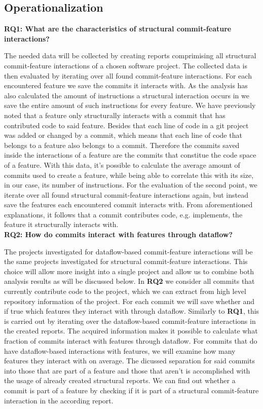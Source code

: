 \subsection*{Operationalization}\label{sec:operationalization}

\textbf{RQ1: What are the characteristics of structural commit-feature interactions?}

The needed data will be collected by creating reports comprimising all structural commit-feature interactions of a chosen software project.
The collected data is then evaluated by iterating over all found commit-feature interactions.
For each encountered feature we save the commits it interacts with.
As the analysis has also calculated the amount of instructions a structural interaction occurs in 
we save the entire amount of such instructions for every feature.
We have previously noted that a feature only structurally interacts with a commit that has contributed code to said feature.
Besides that each line of code in a git project was added or changed by a commit, 
which means that each line of code that belongs to a feature also belongs to a commit.
Therefore the commits saved inside the interactions of a feature are the commits that constitue the code space of a feature. 
With this data, it's possible to calculate the average amount of commits used to create a feature, 
while being able to correlate this with its size, in our case, its number of instructions.
For the evaluation of the second point, we iterate over all found structural commit-feature interactions again, 
but instead save the features each encountered commit interacts with. 
From aforementioned explanations, it follows that a commit contributes code, e.g. implements, the feature it structurally interacts with. \\ 

\textbf{RQ2: How do commits interact with features through dataflow?}

The projects investigated for dataflow-based commit-feature interactions will be the same projects investigated for structural commit-feature interactions.
This choice will allow more insight into a single project and allow us to combine both analysis results as will be discussed below.
In \textbf{RQ2} we consider all commits that currently contribute code to the project, 
which we can extract from high level repository information of the project.
For each commit we will save whether and if true which features they interact with through dataflow.
Similarly to \textbf{RQ1}, this is carried out by iterating over the dataflow-based commit-feature interactions in the created reports.
The acquired information makes it possible to calculate what fraction of commits interact with features through dataflow.
For commits that do have dataflow-based interactions with features, we will examine how many features they interact with on average.
The dicussed separation for said commits into those that are part of a feature and those that aren't 
is accomplished with the usage of already created structural reports. 
We can find out whether a commit is part of a feature by checking if it is part of a structural commit-feature interaction in the according report. \\

